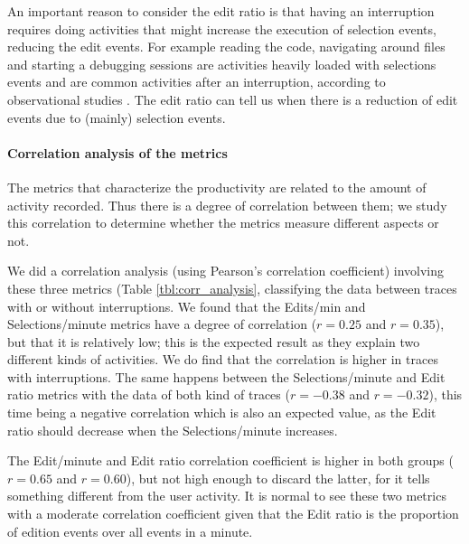 \documentclass[times]{smrauth}
\newcommand\RR[1]{\textbf{Romain #1}}
\begin{document}

An important reason to consider the edit ratio is that having an interruption requires doing activities that might increase the execution of selection events, reducing the edit events. For example reading the code, navigating around files and starting a debugging sessions are activities heavily loaded with selections events and are common activities after an interruption, according to observational studies \cite{PR11}. The edit ratio can tell us when there is a reduction of edit events due to (mainly) selection events.

\paragraph{Correlation analysis of the metrics}
The metrics that characterize the productivity are related to the amount of activity recorded. Thus there is a degree of correlation between them; we study this correlation to determine whether the metrics measure different aspects or not.  %

We did a correlation analysis (using Pearson's correlation coefficient) involving these three metrics (Table \ref{tbl:corr_analysis}, classifying the data between traces with or without interruptions. We found that the Edits/min and Selections/minute metrics have a degree of correlation ($r=0.25$ and $r=0.35$), but that it is relatively low; this is the expected result as they explain two different kinds of activities. We do find that the correlation is higher in traces with interruptions. The same happens between the Selections/minute and Edit ratio metrics with the data of both kind of traces ($r=-0.38$ and $r=-0.32$), this time being a negative correlation which is also an expected value, as the Edit ratio should decrease when the Selections/minute increases. 

The Edit/minute and Edit ratio correlation coefficient is higher in both groups ($r=0.65$ and $r=0.60$), but not high enough to discard the latter, for it tells something different from the user activity. It is normal to see these two metrics with a moderate correlation coefficient given that the Edit ratio is the proportion of edition events over all events in a minute.
\end{document}
